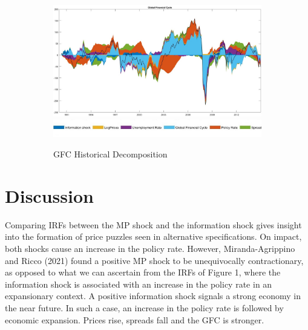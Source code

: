 \documentclass[11pt,a4paper]{article}
\begin{document}
\begin{figure}[hp]
        \vspace{0.2cm} %
        
        \begin{subfigure}{\textwidth}
            \centering
            \includegraphics[scale=.32]{Graphs/GFC_HD_3lags.jpg}
            \includegraphics*[scale=0.21]{Graphs/Inkedlegend.jpg}
            \captionsetup{font=scriptsize}
            \caption{GFC Historical Decomposition}
            \label{fig:GFChd}
        \end{subfigure}

        \caption{ }
        \label{fig:additional_elements}
    \end{figure}




\section{Discussion}


Comparing IRFs between the MP shock and the information shock gives insight into the formation of price puzzles seen in alternative specifications. 
On impact, both shocks cause an increase in the policy rate. However, Miranda-Agrippino and Ricco (2021) found a positive MP shock to be unequivocally contractionary, as opposed to what we can ascertain from the IRFs of Figure 1, where the information shock is associated with an increase in the policy rate in an expansionary context. 
A positive information shock signals a strong economy in the near future. In such a case, an increase in the policy rate is followed by economic expansion. Prices rise, spreads fall and the GFC is stronger. 
    
\end{document}
